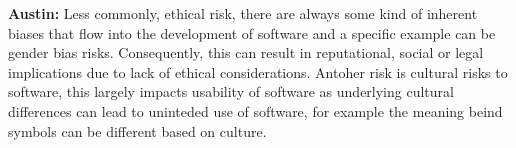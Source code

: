 \documentclass{article}
\begin{document}
\begin{enumerate}
    \textbf{Austin:} Less commonly, ethical risk, there are always some kind of inherent biases that flow into the development of software and a specific example can be gender bias risks. Consequently, this can result in reputational, social or legal implications due to lack of ethical considerations. Antoher risk is cultural risks to software, this largely impacts usability of software as underlying cultural differences can lead to uninteded use of software, for example the meaning beind symbols can be different based on culture.

\end{enumerate}
\end{document}

